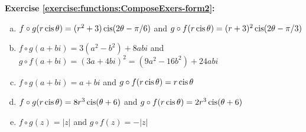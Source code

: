 \noindent\textbf{Exercise \ref{exercise:functions:ComposeExers-form2}:}\\
\begin{enumerate}[(a)]
\item 
 $f\circ g(r \operatorname{cis} \theta) = (r^2+3)\operatorname{cis}(2\theta - \pi/6)$ and $g \circ f(r \operatorname{cis} \theta) = (r+3)^2 \operatorname{cis} (2\theta - \pi/3)$ 
\item \label{composeC2}
 $f\circ g(a + bi) = 3(a^2-b^2) + 8abi$ and $g\circ f (a + bi) = (3a+4bi)^2 = (9a^2 - 16b^2) + 24abi$ 
\item \label{composeC3}
 $f \circ g (a+bi) = a + bi$ and $g \circ f(r \operatorname{cis} \theta) = r \operatorname{cis} \theta$ 
\item \label{composeC4}
 $f \circ g(r \operatorname{cis} \theta) = 8r^3 \operatorname{cis} (\theta + 6)$  and $g \circ f(r \operatorname{cis} \theta) = 2r^3 \operatorname{cis} (\theta + 6)$ 
\item \label{composeC5}
 $f\circ g(z) = |z|$ and $g \circ f(z) = -|z|$ 
\end{enumerate}

